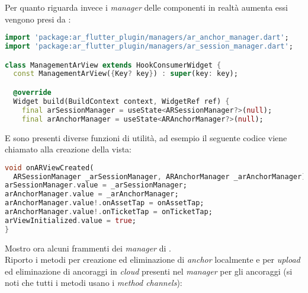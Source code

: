 Per quanto riguarda invece i \textit{manager} delle componenti in realtà aumenta essi vengono presi da \aplug{}:

\begin{lstlisting}[language=dart, label={lst:mobilesyn_managers}, firstnumber=1,caption={mobilesyn \textit{managers}}]
import 'package:ar_flutter_plugin/managers/ar_anchor_manager.dart';
import 'package:ar_flutter_plugin/managers/ar_session_manager.dart';

class ManagementArView extends HookConsumerWidget {
  const ManagementArView({Key? key}) : super(key: key);

  @override
  Widget build(BuildContext context, WidgetRef ref) {
    final arSessionManager = useState<ARSessionManager?>(null);
    final arAnchorManager = useState<ARAnchorManager?>(null);
\end{lstlisting} 

E sono presenti diverse funzioni di utilità, ad esempio il seguente codice viene chiamato alla creazione della vista:

\begin{lstlisting}[language=dart, label={lst:mobilesyn_onARViewCreated}, firstnumber=1,caption={mobilesyn \textit{on ar view created}}]
void onARViewCreated(
  ARSessionManager _arSessionManager, ARAnchorManager _arAnchorManager) {
arSessionManager.value = _arSessionManager;
arAnchorManager.value = _arAnchorManager;
arAnchorManager.value!.onAssetTap = onAssetTap;
arAnchorManager.value!.onTicketTap = onTicketTap;
arViewInitialized.value = true;
}
\end{lstlisting} 

Mostro ora alcuni frammenti dei \textit{manager} di \aplug{}.\\
Riporto i metodi per creazione ed eliminazione di \textit{anchor} localmente e per \textit{upload} ed eliminazione di ancoraggi in \textit{cloud} presenti nel \textit{manager} per gli ancoraggi (si noti che tutti i metodi usano i \textit{method channels}): 

